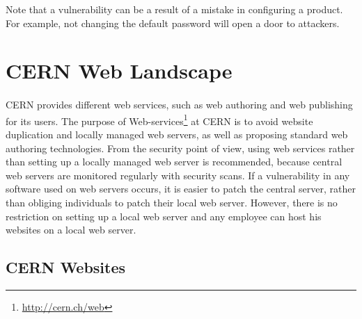 Note that a vulnerability can be a result of a mistake in configuring a product. For example, not changing the default password will open a door to attackers. 

\section{CERN Web Landscape}
\paragraph{}
CERN provides different web services, such as web authoring and web publishing for its users. The purpose of Web-services\footnote{\url{http://cern.ch/web}} at CERN is to avoid website duplication and locally managed web servers, as well as proposing standard web authoring technologies. From the security point of view, using web services rather than setting up a locally managed web server is recommended, because central web servers are monitored regularly with security scans. If a vulnerability in any software used on web servers occurs, it is easier to patch the central server, rather than obliging individuals to patch their local web server. However, there is no restriction on setting up a local web server and any employee can host his websites on a local web server. 

\subsection{CERN Websites}
